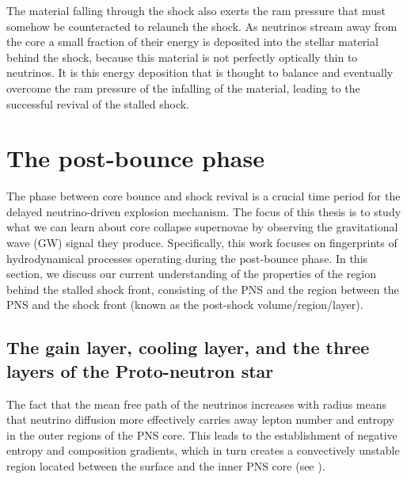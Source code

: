 The material falling through the
shock also exerts the ram pressure that must somehow be counteracted to relaunch the shock.
As neutrinos stream away from the core a small fraction of their energy is deposited into the
stellar material behind the shock, because this material is not perfectly optically thin to neutrinos.
It is this energy deposition that is thought to balance and eventually overcome the ram pressure of the infalling of the material, leading to the successful revival of the stalled shock.

\section{The post-bounce phase}
The phase between core bounce and shock revival is a crucial time period for the delayed neutrino-driven explosion mechanism. 
The focus of this thesis is to study what we can learn about core collapse supernovae
by observing the gravitational wave (GW) signal they produce. Specifically, this work focuses on
fingerprints of hydrodynamical processes operating during the post-bounce phase. 
In this section, we discuss our current understanding of the properties of the region behind
the stalled shock front, consisting of the PNS and the region between the PNS and the shock front (known as the post-shock volume/region/layer). 

\subsection{The gain layer, cooling layer, and the three layers of the Proto-neutron star}
The fact that the mean free path of the neutrinos increases with radius means that
neutrino diffusion more effectively carries away lepton number and entropy in the 
outer regions of the PNS core. This leads to the establishment of negative 
entropy and composition gradients, which in turn creates a convectively unstable region located between the surface and the inner PNS core (see ).

